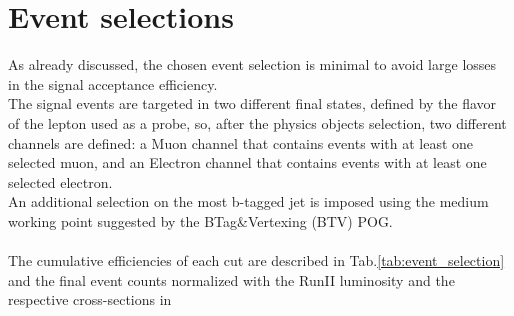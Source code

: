 \section{Event selections}
As already discussed, the chosen event selection is minimal to avoid large losses in the signal acceptance efficiency.\\ 
The signal events are targeted in two different final states, defined by the flavor of the lepton used as a probe, so, after the physics objects selection, two different channels are defined: a Muon channel that contains events with at least one selected muon, and an Electron channel that contains events with at least one selected electron.\\
An additional selection on the most b-tagged jet is imposed using the medium working point suggested by the BTag\&Vertexing (BTV) POG.\\
\\
The cumulative efficiencies of each cut are described in Tab.\ref{tab:event_selection} and the final event counts normalized with the RunII luminosity and the respective cross-sections in 
